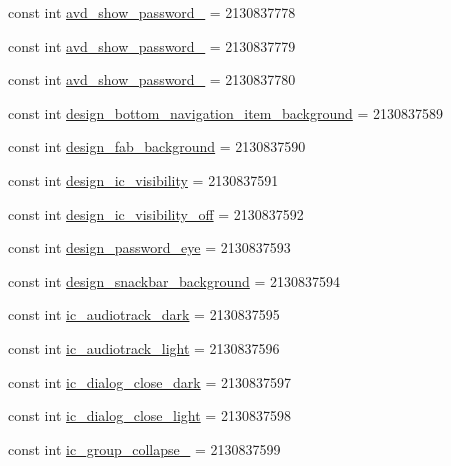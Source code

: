 \begin{CompactItemize}
\item 
const int \hyperlink{class__2doo_1_1_droid_1_1_resource_1_1_drawable_8761f957b176981c316cb46412849700}{avd\_\-show\_\-password\_} = 2130837778
\item 
const int \hyperlink{class__2doo_1_1_droid_1_1_resource_1_1_drawable_e2cbdb967775e4e6c84718183f6e4b49}{avd\_\-show\_\-password\_} = 2130837779
\item 
const int \hyperlink{class__2doo_1_1_droid_1_1_resource_1_1_drawable_ae262cb46a5501adacf20db1683b0357}{avd\_\-show\_\-password\_} = 2130837780
\item 
const int \hyperlink{class__2doo_1_1_droid_1_1_resource_1_1_drawable_e66547ebc8e575444f847bb9707d9eab}{design\_\-bottom\_\-navigation\_\-item\_\-background} = 2130837589
\item 
const int \hyperlink{class__2doo_1_1_droid_1_1_resource_1_1_drawable_9a11c5a4f1e7bbe7cfdad609d707a8c6}{design\_\-fab\_\-background} = 2130837590
\item 
const int \hyperlink{class__2doo_1_1_droid_1_1_resource_1_1_drawable_e2f71e19746bf0884a4f2f53ef477c92}{design\_\-ic\_\-visibility} = 2130837591
\item 
const int \hyperlink{class__2doo_1_1_droid_1_1_resource_1_1_drawable_e7caeb0a362397b0a972e729a030e4cf}{design\_\-ic\_\-visibility\_\-off} = 2130837592
\item 
const int \hyperlink{class__2doo_1_1_droid_1_1_resource_1_1_drawable_8780c9b522772baa3e67ea5e9f2cf40e}{design\_\-password\_\-eye} = 2130837593
\item 
const int \hyperlink{class__2doo_1_1_droid_1_1_resource_1_1_drawable_0036229cc52333991f8a75adc96ad54e}{design\_\-snackbar\_\-background} = 2130837594
\item 
const int \hyperlink{class__2doo_1_1_droid_1_1_resource_1_1_drawable_41719331fcb83ae2772541f9232470ae}{ic\_\-audiotrack\_\-dark} = 2130837595
\item 
const int \hyperlink{class__2doo_1_1_droid_1_1_resource_1_1_drawable_8af914bd0e138ac68798d3414c059753}{ic\_\-audiotrack\_\-light} = 2130837596
\item 
const int \hyperlink{class__2doo_1_1_droid_1_1_resource_1_1_drawable_06626d98a66445d587572e2a27a035ef}{ic\_\-dialog\_\-close\_\-dark} = 2130837597
\item 
const int \hyperlink{class__2doo_1_1_droid_1_1_resource_1_1_drawable_d271b889d9dcd0f9001d6d468b1f58f3}{ic\_\-dialog\_\-close\_\-light} = 2130837598
\item 
const int \hyperlink{class__2doo_1_1_droid_1_1_resource_1_1_drawable_c1fd5d18f2ae0b5a1ac98d289ceaa425}{ic\_\-group\_\-collapse\_} = 2130837599

\end{CompactItemize}
